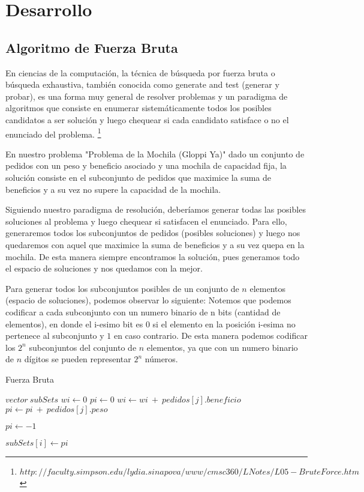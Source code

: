 \section{Desarrollo}
\label{sec:desarrollo}

\subsection{Algoritmo de Fuerza Bruta}

En ciencias de la computación, la técnica de búsqueda por fuerza bruta o búsqueda exhaustiva, también conocida como generate and test (generar y probar), es una forma muy general de resolver problemas y un paradigma de algoritmos que consiste en enumerar sistemáticamente todos los posibles candidatos a ser solución y luego chequear si cada candidato satisface o no el enunciado del problema. \footnote{$http://faculty.simpson.edu/lydia.sinapova/www/cmsc360/LNotes/L05-BruteForce.htm$}

En nuestro problema "Problema de la Mochila (Gloppi Ya)"  dado un conjunto de pedidos con un peso y beneficio asociado y una mochila de capacidad fija, la solución consiste en el subconjunto de pedidos que maximice la suma de beneficios y a su vez no supere la capacidad de la mochila.

Siguiendo nuestro paradigma de resolución, deberíamos generar todas las posibles soluciones al problema y luego chequear si satisfacen el enunciado. Para ello, generaremos todos los subconjuntos de pedidos (posibles soluciones) y luego nos quedaremos con aquel que maximice la suma de beneficios y a su vez quepa en la mochila. De esta manera siempre encontramos la solución, pues generamos todo el espacio de soluciones y nos quedamos con la mejor.

Para generar todos los subconjuntos posibles de un conjunto de $n$ elementos (espacio de soluciones), podemos observar lo siguiente: Notemos que podemos codificar a cada subconjunto con un numero binario de n bits (cantidad de elementos), en donde el i-esimo bit es $0$ si el elemento en la posición i-esima no pertenece al subconjunto y $1$ en caso contrario.
De esta manera podemos codificar los $2^{n}$ subconjuntos del conjunto de $n$ elementos, ya que con un numero binario de $n$ dígitos se pueden representar $2^{n}$ números.

\begin{algorithm}
\caption{Fuerza Bruta}\label{selection}
\begin{algorithmic}[1]
	\State $vector \ subSets$
   	\State $wi \gets 0$
	\State $pi \gets 0$
    	\State $wi \gets wi\ +\ pedidos[j].beneficio$
	\State $pi \gets pi\ +\ pedidos[j].peso$
	\EndIf
	\EndFor

	\State $pi \gets -1$
	\EndIf

	\State $subSets[i] \gets pi $
    \EndFor


\EndProcedure
\end{algorithmic}
\end{algorithm}


